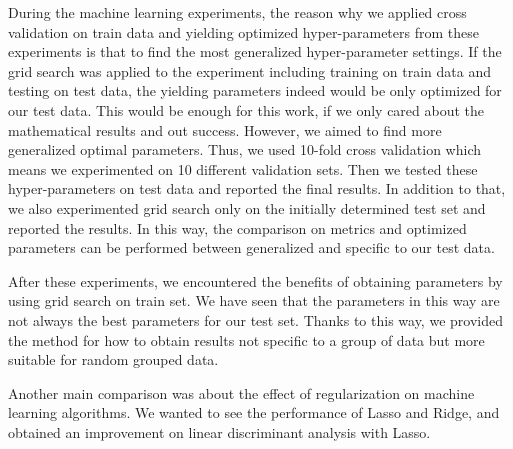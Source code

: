 During the machine learning experiments, the reason why we applied cross validation on train data and yielding optimized hyper-parameters from these experiments is that to find the most generalized hyper-parameter settings. If the grid search was applied to the experiment including training on train data and testing on test data, the yielding parameters indeed would be only optimized for our test data. This would be enough for this work, if we only cared about the mathematical results and out success. However, we aimed to find more generalized optimal parameters. Thus, we used 10-fold cross validation which means we experimented on 10 different validation sets. Then we tested these hyper-parameters on test data and reported the final results. In addition to that, we also experimented grid search only on the initially determined test set and reported the results. In this way, the comparison on metrics and optimized parameters can be performed between generalized and specific to our test data.

After these experiments, we encountered the benefits of obtaining parameters by using grid search on train set. We have seen that the parameters in this way are not always the best parameters for our test set. Thanks to this way, we provided the method for how to obtain results not specific to a group of data but more suitable for random grouped data.

Another main comparison was about the effect of regularization on machine learning algorithms. We wanted to see the performance of Lasso and Ridge, and obtained an improvement on linear discriminant analysis with Lasso.

